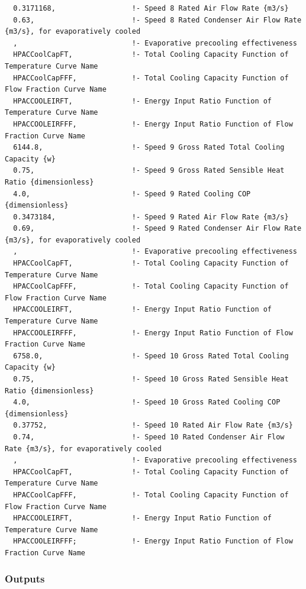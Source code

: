 \begin{lstlisting}
  0.3171168,                  !- Speed 8 Rated Air Flow Rate {m3/s}
  0.63,                       !- Speed 8 Rated Condenser Air Flow Rate {m3/s}, for evaporatively cooled
  ,                           !- Evaporative precooling effectiveness
  HPACCoolCapFT,              !- Total Cooling Capacity Function of Temperature Curve Name
  HPACCoolCapFFF,             !- Total Cooling Capacity Function of Flow Fraction Curve Name
  HPACCOOLEIRFT,              !- Energy Input Ratio Function of Temperature Curve Name
  HPACCOOLEIRFFF,             !- Energy Input Ratio Function of Flow Fraction Curve Name
  6144.8,                     !- Speed 9 Gross Rated Total Cooling Capacity {w}
  0.75,                       !- Speed 9 Gross Rated Sensible Heat Ratio {dimensionless}
  4.0,                        !- Speed 9 Rated Cooling COP {dimensionless}
  0.3473184,                  !- Speed 9 Rated Air Flow Rate {m3/s}
  0.69,                       !- Speed 9 Rated Condenser Air Flow Rate {m3/s}, for evaporatively cooled
  ,                           !- Evaporative precooling effectiveness
  HPACCoolCapFT,              !- Total Cooling Capacity Function of Temperature Curve Name
  HPACCoolCapFFF,             !- Total Cooling Capacity Function of Flow Fraction Curve Name
  HPACCOOLEIRFT,              !- Energy Input Ratio Function of Temperature Curve Name
  HPACCOOLEIRFFF,             !- Energy Input Ratio Function of Flow Fraction Curve Name
  6758.0,                     !- Speed 10 Gross Rated Total Cooling Capacity {w}
  0.75,                       !- Speed 10 Gross Rated Sensible Heat Ratio {dimensionless}
  4.0,                        !- Speed 10 Gross Rated Cooling COP {dimensionless}
  0.37752,                    !- Speed 10 Rated Air Flow Rate {m3/s}
  0.74,                       !- Speed 10 Rated Condenser Air Flow Rate {m3/s}, for evaporatively cooled
  ,                           !- Evaporative precooling effectiveness
  HPACCoolCapFT,              !- Total Cooling Capacity Function of Temperature Curve Name
  HPACCoolCapFFF,             !- Total Cooling Capacity Function of Flow Fraction Curve Name
  HPACCOOLEIRFT,              !- Energy Input Ratio Function of Temperature Curve Name
  HPACCOOLEIRFFF;             !- Energy Input Ratio Function of Flow Fraction Curve Name
\end{lstlisting}

\subsubsection{Outputs}\label{outputs-13-001}

